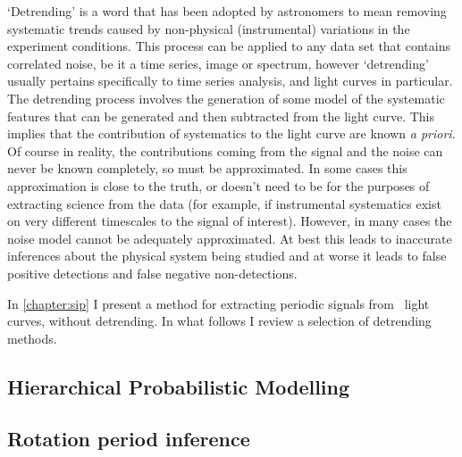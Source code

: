 `Detrending' is a word that has been adopted by astronomers to mean removing
systematic trends caused by non-physical (\eg instrumental) variations in the
experiment conditions.
This process can be applied to any data set that contains correlated noise, be
it a time series, image or spectrum, however `detrending' usually pertains
specifically to time series analysis, and light curves in particular.
The detrending process involves the generation of some model of the systematic
features that can be generated and then subtracted from the light curve.
This implies that the contribution of systematics to the light curve are known
{\it a priori}.
Of course in reality, the contributions coming from the signal and the noise
can never be known completely, so must be approximated.
In some cases this approximation is close to the truth, or doesn't need to be
for the purposes of extracting science from the data (for example, if
instrumental systematics exist on very different timescales to the signal of
interest).
However, in many cases the noise model cannot be adequately approximated.
At best this leads to inaccurate inferences about the physical system being
studied and at worse it leads to false positive detections and false negative
non-detections.

In \textsection \ref{chapter:sip} I present a method for extracting periodic
signals from \ktwo\ light curves, without detrending.
In what follows I review a selection of detrending methods.

\subsection{Hierarchical Probabilistic Modelling}

\subsection{Rotation period inference}
